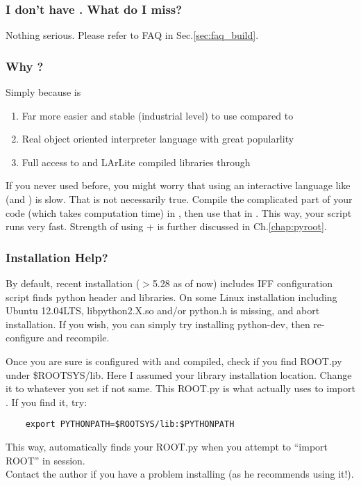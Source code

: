 \subsubsection{I don't have \clang. What do I miss?}
Nothing serious. Please refer to FAQ in Sec.\ref{sec:faq_build}.

\subsubsection{Why \PyROOT?}
Simply because \python is 
\begin{enumerate}
\item Far more easier and stable (industrial level) to use compared to \CINT
\item Real object oriented interpreter language with great popularlity 
\item Full access to \ROOT and LArLite compiled libraries through \PyROOT
\end{enumerate}
If you never used \PyROOT before, you might worry that using an interactive language like \python (and \CINT) is slow.
That is not necessarily true. 
Compile the complicated part of your code (which takes computation time) in \CPP, then use that in \python. 
This way, your \python script runs very fast.
Strength of using \python + \PyROOT is further discussed in Ch.\ref{chap:pyroot}.

\subsubsection{\PyROOT Installation Help?}
\label{sec:pyroothelp}
By default, recent \ROOT installation ($>$5.28 as of now) includes \PyROOT IFF \ROOT configuration script finds python header and libraries. 
On some Linux installation including Ubuntu 12.04LTS, {\ttfamily libpython2.X.so} and/or {\ttfamily python.h} is missing, and \ROOT abort \PyROOT installation.
If you wish, you can simply try installing {\ttfamily python-dev}, then re-configure \ROOT and recompile. 

Once you are sure \ROOT is configured with \python and compiled, check if you find {\ttfamily ROOT.py} under {\ttfamily \$ROOTSYS/lib}. Here I assumed your \ROOT library installation location. Change it to whatever you set if not same. This {\ttfamily ROOT.py} is what \python actually uses to import \ROOT. If you find it, try:
\begin{lstlisting}
    export PYTHONPATH=$ROOTSYS/lib:$PYTHONPATH
\end{lstlisting}
This way, \python automatically finds your {\ttfamily ROOT.py} when you attempt to ``import ROOT'' in \python session.\\

\noindent Contact the author if you have a problem installing \PyROOT (as he recommends using it!).








